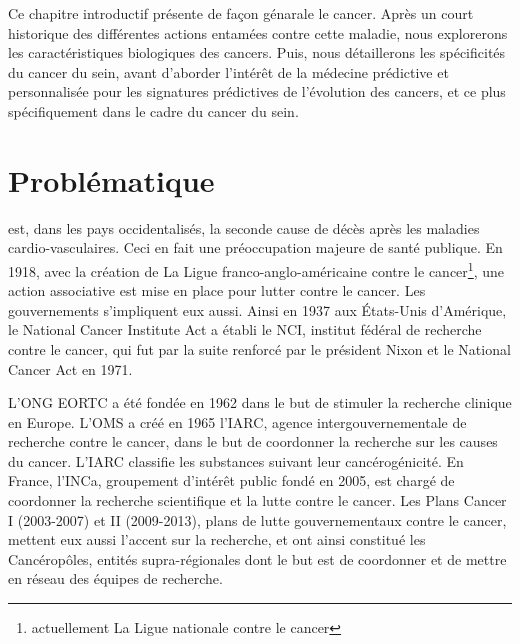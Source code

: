 \singlespacing

		\begin{center}
				\begin{tcolorbox}[colback=red!5!white,colframe=red!45!black,arc=0mm]

					\sffamily
						Ce chapitre introductif présente de façon génarale le cancer.
						Après un court historique des différentes actions entamées contre cette maladie, nous explorerons les caractéristiques biologiques des cancers.
						Puis, nous détaillerons les spécificités du cancer du sein, avant d'aborder l'intérêt de la médecine prédictive et personnalisée pour les signatures prédictives de l'évolution des cancers, et ce plus spécifiquement dans le cadre du cancer du sein.
					\end{tcolorbox}
					\vspace{5ex}
					\minitoc
		\end{center}
		\newpage

	\doublespacing

	\section*{\textcolor{red!45!black}{Problématique}}\label{sec:Problématique}
		 est, dans les pays occidentalisés, la seconde cause de décès après les maladies cardio-vasculaires.
		Ceci en fait une préoccupation majeure de santé publique.
		En 1918, avec la création de La Ligue franco-anglo-américaine contre le cancer\footnote{actuellement La Ligue nationale contre le cancer}, une action associative est mise en place pour lutter contre le cancer.
		Les gouvernements s'impliquent eux aussi.
		Ainsi en 1937 aux États-Unis d'Amérique, le National Cancer Institute Act a établi le \ac{NCI}, institut fédéral de recherche contre le cancer, qui fut par la suite renforcé par le président Nixon et le National Cancer Act en 1971.

		L'\ac{ONG} \ac{EORTC} a été fondée en 1962 dans le but de stimuler la recherche clinique en Europe.
		L'\ac{OMS} a créé en 1965 l'\ac{IARC}, agence intergouvernementale de recherche contre le cancer, dans le but de coordonner la recherche sur les causes du cancer.
		L'\ac{IARC} classifie les substances suivant leur cancérogénicité.
		En France, l'\ac{INCa}, groupement d'intérêt public fondé en 2005, est chargé de coordonner la recherche scientifique et la lutte contre le cancer.
		Les Plans Cancer I (2003-2007) et II (2009-2013), plans de lutte gouvernementaux contre le cancer, mettent eux aussi l'accent sur la recherche, et ont ainsi constitué les Cancéropôles, entités supra-régionales dont le but est de coordonner et de mettre en réseau des équipes de recherche.
		
